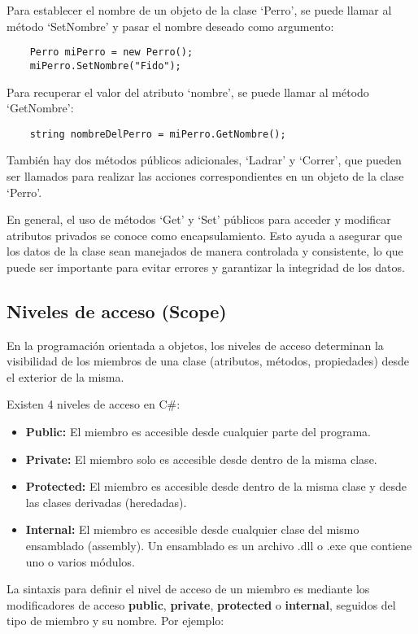 \documentclass[executivepaper]{article}
\begin{document}
Para establecer el nombre de un objeto de la clase \enquote*{Perro}, se puede llamar al método \enquote*{SetNombre} y pasar el nombre deseado como argumento:
\begin{lstlisting}
    Perro miPerro = new Perro();
    miPerro.SetNombre("Fido");
\end{lstlisting}

Para recuperar el valor del atributo \enquote*{nombre}, se puede llamar al método \enquote*{GetNombre}:
\begin{lstlisting}
    string nombreDelPerro = miPerro.GetNombre();
\end{lstlisting}
También hay dos métodos públicos adicionales, \enquote*{Ladrar} y \enquote*{Correr}, que pueden ser llamados para realizar las acciones correspondientes en un objeto de la clase \enquote*{Perro}.

En general, el uso de métodos \enquote*{Get} y \enquote*{Set} públicos para acceder y modificar atributos privados se conoce como encapsulamiento. Esto ayuda a asegurar que los datos de la clase sean manejados de manera controlada y consistente, lo que puede ser importante para evitar errores y garantizar la integridad de los datos.

\subsection{Niveles de acceso (Scope)}

En la programación orientada a objetos, los niveles de acceso determinan la visibilidad de los miembros de una clase (atributos, métodos, propiedades) desde el exterior de la misma.

Existen 4 niveles de acceso en C\#:

\begin{itemize}
\item \textbf{Public:} El miembro es accesible desde cualquier parte del programa.
\item \textbf{Private:} El miembro solo es accesible desde dentro de la misma clase.
\item \textbf{Protected:} El miembro es accesible desde dentro de la misma clase y desde las clases derivadas (heredadas).
\item \textbf{Internal:} El miembro es accesible desde cualquier clase del mismo ensamblado (assembly). Un ensamblado es un archivo .dll o .exe que contiene uno o varios módulos.
\end{itemize}

La sintaxis para definir el nivel de acceso de un miembro es mediante los modificadores de acceso \textbf{public}, \textbf{private}, \textbf{protected} o \textbf{internal}, seguidos del tipo de miembro y su nombre. Por ejemplo:
\end{document}
